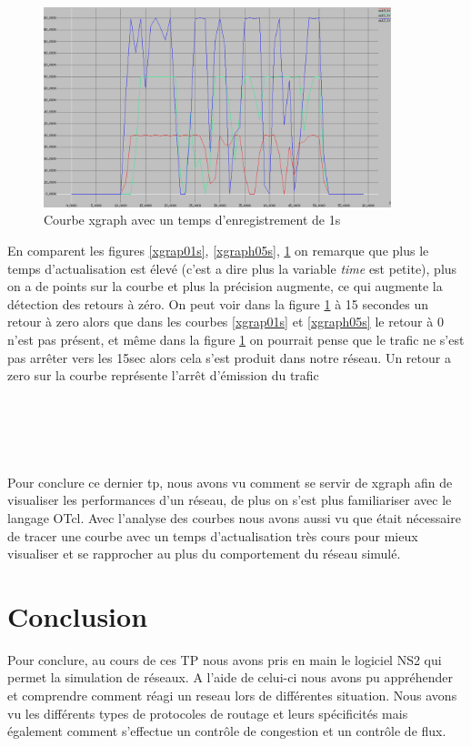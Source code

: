\documentclass[11pt]{article}
\begin{document}
\begin{figure}[H]
	\begin{center}
		\includegraphics[width=0.9\textwidth]{assets/tp3/xgraph1s.png}
	\end{center}
	\caption{Courbe xgraph avec un temps d'enregistrement de 1s}
	\label{xgraph1S}
\end{figure}

En comparent les figures \ref{xgrap01s}, \ref{xgraph05s}, \ref{xgraph1S} on remarque que plus le temps d’actualisation est élevé (c'est a dire plus la variable \textit{time} est petite), plus on a de points sur la courbe et plus la précision augmente, ce qui augmente la détection des retours à zéro. On peut voir dans la figure \ref{xgraph1S} à 15 secondes un retour à zero alors que dans les courbes \ref{xgrap01s} et \ref{xgraph05s} le retour à 0 n'est pas présent, et même dans la figure \ref{xgraph1S} on pourrait pense que le trafic ne s'est pas arrêter vers les 15sec alors cela s'est produit dans notre réseau. Un retour a zero sur la courbe représente l’arrêt d'émission du trafic \\


~\\
\\
\\
\\
\\


Pour conclure ce dernier tp, nous avons vu comment se servir de xgraph afin de visualiser les performances d'un réseau, de plus on s'est plus familiariser avec le langage OTcl. Avec l'analyse des courbes nous avons aussi vu que était nécessaire de tracer une courbe avec un temps d’actualisation très cours pour mieux visualiser et se rapprocher au plus du comportement du réseau simulé.



\pagebreak
\section*{Conclusion}
Pour conclure, au cours de ces TP nous avons pris en main le logiciel NS2 qui permet la simulation de réseaux. A l'aide de celui-ci nous avons pu appréhender et comprendre comment réagi un reseau lors de différentes situation. Nous avons vu les différents types de protocoles de routage et leurs spécificités mais également comment s'effectue un contrôle de congestion et un contrôle de flux.
\end{document}
